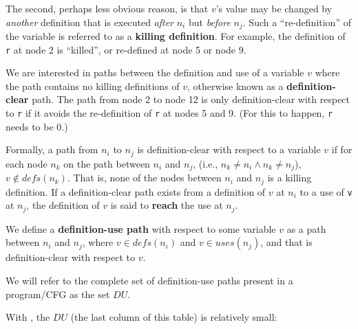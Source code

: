 
The second, perhaps less obvious reason, is that $v$'s value may be changed by
{\it another} definition that is executed {\it after} $n_i$ but {\it before}
$n_j$. Such a ``re-definition'' of the variable is referred to as a {\bf killing
definition}. For example, the definition of {\tt r} at node 2 is ``killed'', or
re-defined at node 5 or node 9. 


We are interested in paths between the definition and use of a variable $v$
where the path contains no killing definitions of $v$, otherwise known as a {\bf
definition-clear} path. The path from node 2 to node 12 is only definition-clear
with respect to {\tt r} if it avoids the re-definition of {\tt r} at nodes 5 and
9. (For this to happen, {\tt r} needs to be 0.)


Formally, a path from $n_i$ to $n_j$ is definition-clear with respect to a
variable $v$ if for each node $n_k$ on the path between $n_i$ and $n_j$, (i.e.,
$n_k \neq n_i \wedge n_k \neq n_j$), $v \notin \mathit{defs}(n_k)$. That is,
none of the nodes between $n_i$ and $n_j$ is a killing definition. 
%
If a definition-clear path exists from a definition of $v$ at $n_i$ to a
use of {\tt v} at $n_j$, the definition of $v$ is said to {\bf reach} the use
at $n_j$.


We define a {\bf definition-use path} with respect to some variable $v$ as a
path between $n_i$ and $n_j$, where $v \in \mathit{defs}(n_i)$ and $v \in
\mathit{uses}(n_j)$, and that is definition-clear with respect to $v$.

We will refer to the complete set of definition-use paths present in a
program/CFG as the set $\mathit{DU}$. 


With \signmethod, the $DU$ (the last column of this table) is relatively small:

